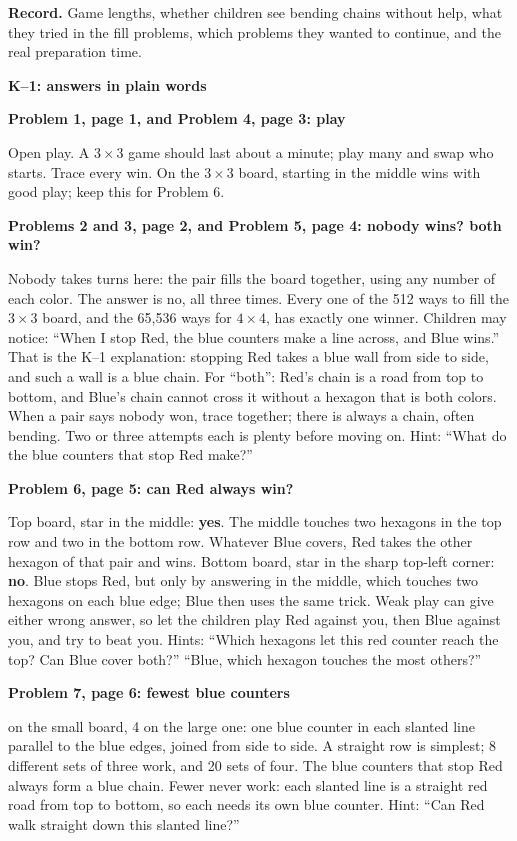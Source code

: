 \documentclass[11pt]{article}
\newcommand{\head}[1]{\par\textbf{\large #1}\par\nopagebreak}
\newcommand{\sub}[1]{\par\textbf{#1}\par\nopagebreak}
\newcommand{\x}{\ensuremath{\times}}
\begin{document}
\textbf{Record.} Game lengths, whether children see bending chains without help, what they tried in the fill problems, which problems they wanted to continue, and the real preparation time.

\head{K--1: answers in plain words}
\sub{Problem 1, page 1, and Problem 4, page 3: play}
Open play. A $3\x3$ game should last about a minute; play many and swap who starts. Trace every win. On the $3\x3$ board, starting in the middle wins with good play; keep this for Problem 6.

\sub{Problems 2 and 3, page 2, and Problem 5, page 4: nobody wins? both win?}
Nobody takes turns here: the pair fills the board together, using any number of each color. The answer is no, all three times. Every one of the 512 ways to fill the $3\x3$ board, and the 65{,}536 ways for $4\x4$, has exactly one winner. Children may notice: ``When I stop Red, the blue counters make a line across, and Blue wins.'' That is the K--1 explanation: stopping Red takes a blue wall from side to side, and such a wall is a blue chain. For ``both'': Red's chain is a road from top to bottom, and Blue's chain cannot cross it without a hexagon that is both colors. When a pair says nobody won, trace together; there is always a chain, often bending. Two or three attempts each is plenty before moving on. Hint: ``What do the blue counters that stop Red make?''

\sub{Problem 6, page 5: can Red always win?}
Top board, star in the middle: \textbf{yes}. The middle touches two hexagons in the top row and two in the bottom row. Whatever Blue covers, Red takes the other hexagon of that pair and wins. Bottom board, star in the sharp top-left corner: \textbf{no}. Blue stops Red, but only by answering in the middle, which touches two hexagons on each blue edge; Blue then uses the same trick. Weak play can give either wrong answer, so let the children play Red against you, then Blue against you, and try to beat you. Hints: ``Which hexagons let this red counter reach the top? Can Blue cover both?'' ``Blue, which hexagon touches the most others?''

\sub{Problem 7, page 6: fewest blue counters}
3 on the small board, 4 on the large one: one blue counter in each slanted line parallel to the blue edges, joined from side to side. A straight row is simplest; 8 different sets of three work, and 20 sets of four. The blue counters that stop Red always form a blue chain. Fewer never work: each slanted line is a straight red road from top to bottom, so each needs its own blue counter. Hint: ``Can Red walk straight down this slanted line?''
\end{document}
